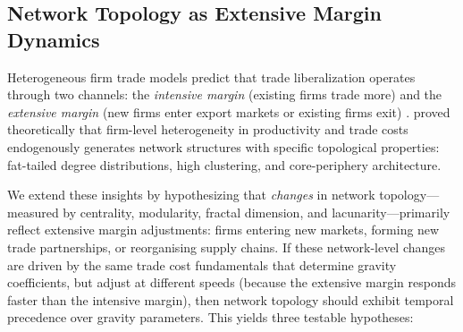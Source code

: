 \documentclass[preprint, 3p,
authoryear]{elsarticle} %
\begin{document}
\subsection{Network Topology as Extensive Margin
Dynamics}\label{subsec:theory_networks}

Heterogeneous firm trade models predict that trade liberalization
operates through two channels: the \textit{intensive margin} (existing
firms trade more) and the \textit{extensive margin} (new firms enter
export markets or existing firms exit)
\citep{helpman2008, melitz2015new}. \citet{chaney2014} proved
theoretically that firm-level heterogeneity in productivity and trade
costs endogenously generates network structures with specific
topological properties: fat-tailed degree distributions, high
clustering, and core-periphery architecture.

We extend these insights by hypothesizing that \textit{changes} in
network topology---measured by centrality, modularity, fractal
dimension, and lacunarity---primarily reflect extensive margin
adjustments: firms entering new markets, forming new trade partnerships,
or reorganising supply chains. If these network-level changes are driven
by the same trade cost fundamentals that determine gravity coefficients,
but adjust at different speeds (because the extensive margin responds
faster than the intensive margin), then network topology should exhibit
temporal precedence over gravity parameters. This yields three testable
hypotheses:
\end{document}
